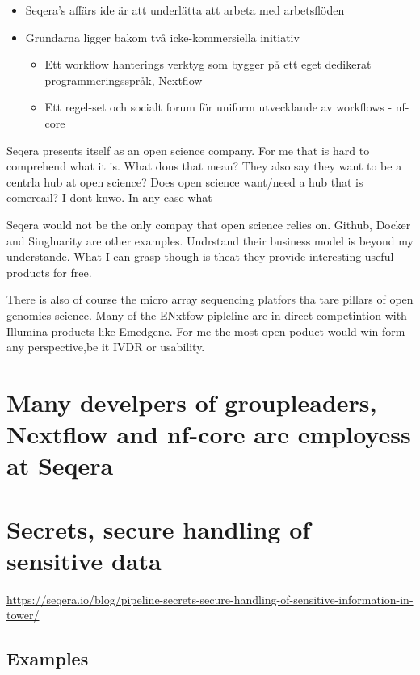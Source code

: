\documentclass[
  letterpaper,
  DIV=11,
  numbers=noendperiod]{scrreprt}
\providecommand{\tightlist}{%
  \setlength{\itemsep}{0pt}\setlength{\parskip}{0pt}}\usepackage{longtable,booktabs,array}
\begin{document}
\begin{itemize}
\tightlist
\item
  Seqera's affärs ide är att underlätta att arbeta med arbetsflöden
\item
  Grundarna ligger bakom två icke-kommersiella initiativ

  \begin{itemize}
  \tightlist
  \item
    Ett workflow hanterings verktyg som bygger på ett eget dedikerat
    programmeringsspråk, Nextflow
  \item
    Ett regel-set och socialt forum för uniform utvecklande av workflows
    - nf-core
  \end{itemize}
\end{itemize}

Seqera presents itself as an open science company. For me that is hard
to comprehend what it is. What dous that mean? They also say they want
to be a centrla hub at open science? Does open science want/need a hub
that is comercail? I dont knwo. In any case what

Seqera would not be the only compay that open science relies on. Github,
Docker and Singluarity are other examples. Undrstand their business
model is beyond my understande. What I can grasp though is theat they
provide interesting useful products for free.

There is also of course the micro array sequencing platfors tha tare
pillars of open genomics science. Many of the ENxtfow pipleline are in
direct competintion with Illumina products like Emedgene. For me the
most open poduct would win form any perspective,be it IVDR or usability.

\section{Many develpers of groupleaders, Nextflow and nf-core are
employess at
Seqera}\label{many-develpers-of-groupleaders-nextflow-and-nf-core-are-employess-at-seqera}

\section{Secrets, secure handling of sensitive
data}\label{secrets-secure-handling-of-sensitive-data}

\url{https://seqera.io/blog/pipeline-secrets-secure-handling-of-sensitive-information-in-tower/}

\subsection{Examples}\label{examples}
\end{document}
